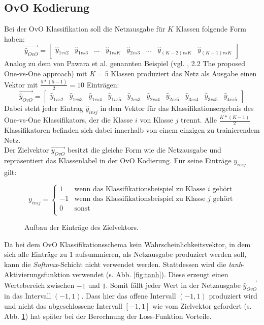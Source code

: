 \subsection{OvO Kodierung}
\label{ch:methodik_ovo}
Bei der OvO Klassifikation soll die Netzausgabe für $K$ Klassen folgende Form haben:
\[\overrightarrow{\widehat{y}_{OvO}} = \begin{bmatrix}
\widehat{y}_{1vs2} & \widehat{y}_{1vs3} & ... & \widehat{y}_{1vsK} & \widehat{y}_{2vs3} &... & \widehat{y}_{(K-2)vs K} & \widehat{y}_{(K-1)vsK}
\end{bmatrix} \]
Analog zu dem von Pawara et al. genannten Beispiel (vgl. \cite{pawaraPaper}, 2.2 The proposed One-vs-One approach) mit $K=5$ Klassen produziert das Netz als Ausgabe einen Vektor mit $\frac{5*(5-1)}{2}=10$ Einträgen:
\[\overrightarrow{\widehat{y}_{OvO}} = \begin{bmatrix}
\widehat{y}_{1vs2} & \widehat{y}_{1vs3} & \widehat{y}_{1vs4} & \widehat{y}_{1vs5} & \widehat{y}_{2vs3} & \widehat{y}_{2vs4} & \widehat{y}_{2vs5} & \widehat{y}_{3vs4} & \widehat{y}_{3vs5} & \widehat{y}_{4vs5}
\end{bmatrix} \]
Dabei steht jeder Eintrag $\widehat{y}_{ivsj}$ in dem Vektor für das Klassifikationsergebnis des One-vs-One Klassifikators, der die Klasse $i$ von Klasse $j$ trennt. Alle $\frac{K*(K-1)}{2}$ Klassifikatoren befinden sich dabei innerhalb von einem einzigen zu trainierendem Netz.\\
Der Zielvektor $\overrightarrow{y_{OvO}}$ besitzt die gleiche Form wie die Netzausgabe und repräsentiert das Klassenlabel in der OvO Kodierung. Für seine Einträge $y_{ivsj}$ gilt:
\begin{figure}[H]
\[
y_{ivsj} = 
\begin{cases}
1 & \text{wenn das Klassifikationsbeispiel zu Klasse } i \text{ gehört}\\
-1 & \text{wenn das Klassifikationsbeispiel zu Klasse } j \text{ gehört}\\
0 & \text{sonst}\\
\end{cases}
\]
\caption{Aufbau der Einträge des Zielvektors.}
\label{gl:OvOZielvektor}
\end{figure}
Da bei dem OvO Klassifikationsschema kein Wahrscheinlichkeitsvektor, in dem sich alle Einträge zu $1$ aufsummieren, als Netzausgabe produziert werden soll, kann die \textit{Softmax}-Schicht nicht verwendet werden. Stattdessen wird die \textit{tanh}-Aktivierungsfunktion verwendet (s. Abb. \ref{fig:tanh}). Diese erzeugt einen Wertebereich zwischen $-1$ und $1$. Somit fällt jeder Wert in der Netzausgabe $\overrightarrow{\widehat{y}_{OvO}}$ in das Intervall $(-1, 1)$. Dass hier das offene Intervall $(-1, 1)$ produziert wird und nicht das abgeschlossene Intervall $[-1, 1]$ wie vom Zielvektor gefordert (s. Abb. \ref{gl:OvOZielvektor}) hat später bei der Berechnung der Loss-Funktion Vorteile.

